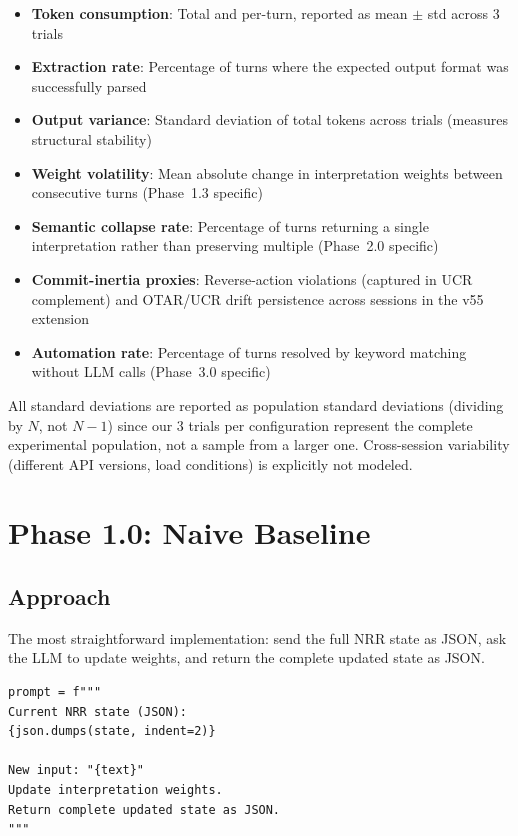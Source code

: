 \documentclass[11pt,a4paper]{article}
\begin{document}
\begin{itemize}
    \item \textbf{Token consumption}: Total and per-turn, reported as mean $\pm$ std
    across 3 trials
    \item \textbf{Extraction rate}: Percentage of turns where the expected output
    format was successfully parsed
    \item \textbf{Output variance}: Standard deviation of total tokens across trials
    (measures structural stability)
    \item \textbf{Weight volatility}: Mean absolute change in interpretation weights
    between consecutive turns (Phase~1.3 specific)
    \item \textbf{Semantic collapse rate}: Percentage of turns returning a single
    interpretation rather than preserving multiple (Phase~2.0 specific)
    \item \textbf{Commit-inertia proxies}: Reverse-action violations (captured in
    UCR complement) and OTAR/UCR drift persistence across sessions in the v55 extension
    \item \textbf{Automation rate}: Percentage of turns resolved by keyword matching
    without LLM calls (Phase~3.0 specific)
\end{itemize}

\noindent All standard deviations are reported as population standard deviations
(dividing by $N$, not $N{-}1$) since our 3 trials per configuration represent
the complete experimental population, not a sample from a larger one.
Cross-session variability (different API versions, load conditions) is
explicitly not modeled.

\section{Phase 1.0: Naive Baseline}
\label{sec:phase1_0}

\subsection{Approach}

The most straightforward implementation: send the full NRR state as JSON, ask the
LLM to update weights, and return the complete updated state as JSON.

\begin{lstlisting}
prompt = f"""
Current NRR state (JSON):
{json.dumps(state, indent=2)}

New input: "{text}"
Update interpretation weights.
Return complete updated state as JSON.
"""
\end{lstlisting}
\end{document}
